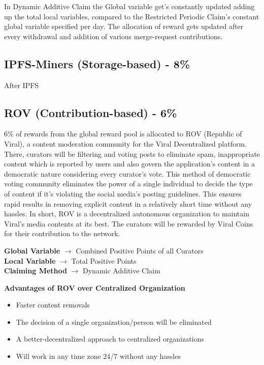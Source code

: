 \documentclass[conference]{IEEEtran}
\begin{document}
In Dynamic Additive Claim the Global variable get's constantly updated adding up the total local variables, compared to the Restricted Periodic Claim's constant global variable specified per day.  The allocation of reward gets updated after every withdrawal and addition of various merge-request contributions. \\


\subsection{\textbf{IPFS-Miners (Storage-based) - 8\%}}

After IPFS\\

\subsection{\textbf{ROV (Contribution-based) - 6\%}}

6\% of rewards from the global reward pool is allocated to ROV (Republic of Viral), a content moderation community for the Viral Decentralized platform. There, curators will be filtering and voting posts to eliminate spam, inappropriate content which is reported by users and also govern the application's content in a democratic nature considering every curator's vote. This method of democratic voting community eliminates the power of a single individual to decide the type of content if it's violating the social media's posting guidelines. This ensures rapid results in removing explicit content in a relatively short time without any hassles. In short, ROV is a decentralized autonomous organization to maintain Viral's media contents at its best. The curators will be rewarded by Viral Coins for their contribution to the network.\\

\begin{center}
\textbf{Global Variable} $\to$ Combined Positive Points of all Curators\\
\vspace{2mm}
\textbf{Local Variable} $\to$ Total Positive Points\\
\vspace{2mm}
\textbf{Claiming Method} $\to$ Dynamic Additive Claim\\
\end{center}

\textbf{Advantages of ROV over Centralized Organization}
\begin{itemize}[wide, labelwidth=!, labelindent=0pt]
\item Faster content removals
\item The decision of a single organization/person will be eliminated
\item A better-decentralized approach to centralized organizations
\item Will work in any time zone 24/7 without any hassles
\end{itemize}
\end{document}
